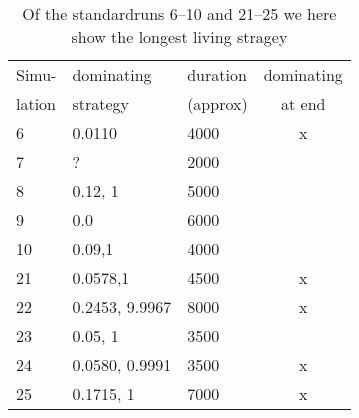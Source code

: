 
\begin{table}[!hbtp]
  \footnotesize
  \centering
  \label{tab:results:dominant610}
  \caption{Of the standardruns 6--10 and 21--25 we here show the longest living stragey}
  
  \begin{tabular}{lllc}
    Simu-  & dominating & duration  & dominating \\
    lation & strategy   & (approx)  & at end \\
    \hline
    6  & 0.0110         & 4000 & x \\          
    7  & ?              & 2000 &            \\ 
    8  & 0.12, 1        & 5000 &            \\ 
    9  & 0.0            & 6000 &            \\ 
    10 & 0.09,1         & 4000 &            \\ 
    21 & 0.0578,1       & 4500 & x \\          
    22 & 0.2453, 9.9967 & 8000 & x \\          
    23 & 0.05, 1        & 3500 &            \\ 
    24 & 0.0580, 0.9991 & 3500 & x \\          
    25 & 0.1715, 1      & 7000 & x \\          
    \hline
  \end{tabular}
\end{table}



